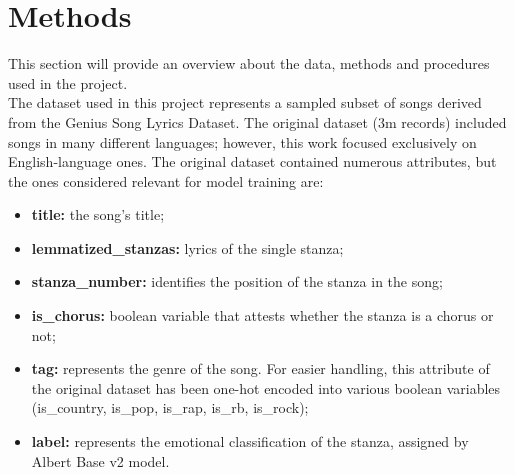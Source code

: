 \chapter{Methods}
\label{ch:capitolo2}

This section will provide an overview about the data, methods and procedures used in the project.\\

The dataset used in this project represents a sampled subset of songs
derived from the Genius Song Lyrics Dataset\textsuperscript{\cite{geniusdataset}}.
The original dataset (3m records) included songs in many different languages; however, this work focused
exclusively on English-language ones.
The original dataset contained numerous attributes, but the ones considered relevant for model training are:
\begin{itemize}
    \item \textbf{title:} the song's title;

    \item \textbf{lemmatized\_stanzas:} lyrics of the single stanza;
    
    \item \textbf{stanza\_number:} identifies the position of the stanza in the song;

    \item \textbf{is\_chorus:} boolean variable that attests whether the stanza is
        a chorus or not;
    
    \item \textbf{tag:} represents the genre of the song. For easier handling,
        this attribute of the original dataset has been one-hot encoded into various boolean variables
        (is\_country, is\_pop, is\_rap, is\_rb, is\_rock);

    \item \textbf{label:} represents the emotional classification of the stanza,
        assigned by Albert Base v2\textsuperscript{\cite{albert-base-v2}} model.
    
\end{itemize}

